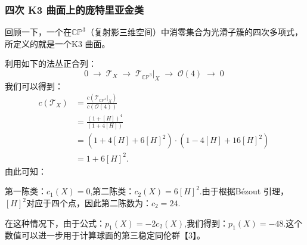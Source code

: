 \subsubsection{四次 K3 曲面上的庞特里亚金类}
回顾一下，一个在$\mathbb{CP}^3$（复射影三维空间）中消零集合为光滑子簇的四次多项式，所定义的就是一个K3 曲面。

利用如下的法丛正合列：
$$
0 \;\longrightarrow\; \mathcal{T}_X
\;\longrightarrow\; \mathcal{T}_{\mathbb{CP}^3}|_X
\;\longrightarrow\; \mathcal{O}(4)
\;\longrightarrow\; 0~
$$
我们可以得到：
$$
\begin{aligned}
c(\mathcal{T}_X)
&= \frac{c(\mathcal{T}_{\mathbb{CP}^3}|_X)}{c(\mathcal{O}(4))} \\[6pt]
&= \frac{(1 + [H])^4}{(1 + 4[H])} \\[6pt]
&= (1 + 4[H] + 6[H]^2) \cdot (1 - 4[H] + 16[H]^2) \\[6pt]
&= 1 + 6[H]^2.
\end{aligned}~
$$
由此可知：

第一陈类：$c_1(X) = 0$,第二陈类：$c_2(X) = 6[H]^2$.由于根据Bézout 引理，$[H]^2$对应于四个点，因此第二陈数为：$c_2 = 24$.

在这种情况下，由于公式：$p_1(X) = -2c_2(X)$,我们得到：$p_1(X) = -48$.这个数值可以进一步用于计算球面的第三稳定同伦群【3】。

